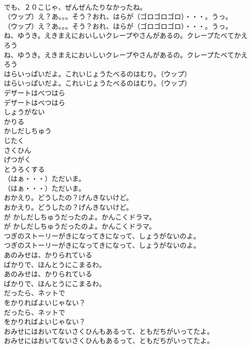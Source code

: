 \documentclass[8pt]{extreport}
\begin{document}
\begin{CJK}{UTF8}{min}
\\	でも、２０こじゃ、ぜんぜんたりなかったね。
\\	（ウップ）え？あ。。。そう？おれ、はらが（ゴロゴロゴロ）・・・。うっ。
\\	（ウップ）え？あ。。。そう？おれ、はらが（ゴロゴロゴロ）・・・。うっ。
\\	ね、ゆうき。えきまえにおいしいクレープやさんがあるの。クレープたベてかえろう
\\	ね、ゆうき。えきまえにおいしいクレープやさんがあるの。クレープたベてかえろう
\\	はらいっぱいだよ。これいじょうたべるのはむり。（ウップ）
\\	はらいっぱいだよ。これいじょうたべるのはむり。（ウップ）
\\	デザートはべつはら
\\	デザートはべつはら
\\	しょうがない
\\	かりる
\\	かしだしちゅう
\\	じたく
\\	さくひん
\\	げつがく
\\	とうろくする
\\	（はぁ・・・）ただいま。
\\	（はぁ・・・）ただいま。
\\	おかえり。どうしたの？げんきないけど。
\\	おかえり。どうしたの？げんきないけど。
\\	が かしだしちゅうだったのよ。かんこくドラマ。
\\	が かしだしちゅうだったのよ。かんこくドラマ。
\\	つぎのストーリーがきになってきになって、しょうがないのよ。
\\	つぎのストーリーがきになってきになって、しょうがないのよ。
\\	あのみせは、かりられている
\\	ばかりで、ほんとうにこまるわ。
\\	あのみせは、かりられている
\\	ばかりで、ほんとうにこまるわ。
\\	だったら、ネットで
\\	をかりればよいじゃない？
\\	だったら、ネットで
\\	をかりればよいじゃない？
\\	おみせにはおいてないさくひんもあるって、ともだちがいってたよ。
\\	おみせにはおいてないさくひんもあるって、ともだちがいってたよ。

\end{CJK}
\end{document}
